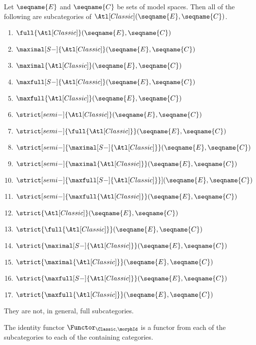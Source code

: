 \documentclass{article}
\begin{document}
\begin{corollary}
\label{cor:ATLCiscat}
Let $\seqname{E}$ and $\seqname{C}$ be sets of model spaces. Then
all of the following are subcategories of
$\Atl[Classic](\seqname{E}, \seqname{C})$.

\begin{enumerate}
\item $\full{\Atl[Classic]}(\seqname{E}, \seqname{C})$
\item $\maximal[S-]{\Atl[Classic]}(\seqname{E}, \seqname{C})$
\item $\maximal{\Atl[Classic]}(\seqname{E}, \seqname{C})$
\item $\maxfull[S-]{\Atl[Classic]}(\seqname{E}, \seqname{C})$
\item $\maxfull{\Atl[Classic]}(\seqname{E}, \seqname{C})$
\item $\strict[semi-]{\Atl[Classic]}(\seqname{E}, \seqname{C})$
\item $\strict[semi-]{\full{\Atl[Classic]}}(\seqname{E}, \seqname{C})$
\item $\strict[semi-]{\maximal[S-]{\Atl[Classic]}}(\seqname{E}, \seqname{C})$
\item $\strict[semi-]{\maximal{\Atl[Classic]}}(\seqname{E}, \seqname{C})$
\item $\strict[semi-]{\maxfull[S-]{\Atl[Classic]}}](\seqname{E}, \seqname{C})$
\item $\strict[semi-]{\maxfull{\Atl[Classic]}}(\seqname{E}, \seqname{C})$
\item $\strict{\Atl[Classic]}(\seqname{E}, \seqname{C})$
\item $\strict{\full{\Atl[Classic]}}(\seqname{E}, \seqname{C})$
\item $\strict{\maximal[S-]{\Atl[Classic]}}(\seqname{E}, \seqname{C})$
\item $\strict{\maximal{\Atl[Classic]}}(\seqname{E}, \seqname{C})$
\item $\strict{\maxfull[S-]{\Atl[Classic]}}(\seqname{E}, \seqname{C})$
\item $\strict{\maxfull{\Atl[Classic]}}(\seqname{E}, \seqname{C})$
\end{enumerate}

\begin{remark}
They are not, in general, full subcategories.
\end{remark}

The identity functor $\Functor_{\Classic,\morphId}$ is a functor from each of the
subcategories to each of the containing categories.
\end{corollary}
\end{document}
